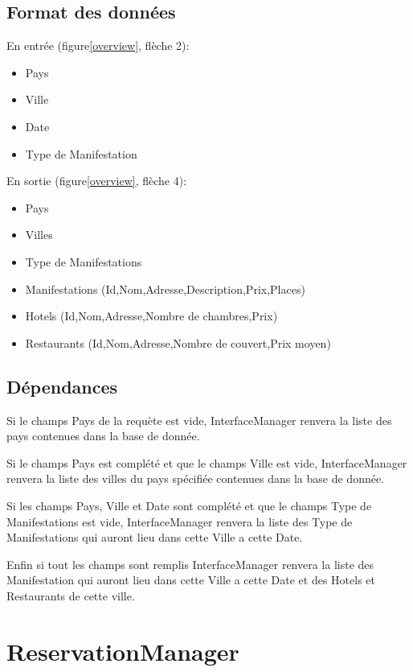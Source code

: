 		\subsection{Format des données}
		
			En entrée (figure\ref{overview}, flèche 2):
			\begin{itemize}
			  \item Pays
			  \item Ville
			  \item Date
			  \item Type de Manifestation\\
			\end{itemize}
			
			En sortie (figure\ref{overview}, flèche 4):
			\begin{itemize}
			  \item Pays
			  \item Villes
			  \item Type de Manifestations
			  \item Manifestations (Id,Nom,Adresse,Description,Prix,Places)
			  \item Hotels (Id,Nom,Adresse,Nombre de chambres,Prix)
			  \item Restaurants (Id,Nom,Adresse,Nombre de couvert,Prix moyen)
			\end{itemize}
		
		\subsection{Dépendances}
		
			Si le champs Pays de la requète est vide, InterfaceManager
			renvera la liste des pays contenues dans la base de donnée.
			
			Si le champs Pays est complété et que le champs Ville est vide,
			InterfaceManager renvera la liste des villes du pays spécifiée contenues dans
			la base de donnée.
		
			Si les champs Pays, Ville et Date sont complété et que le champs Type de
			Manifestations est vide, InterfaceManager renvera la liste des Type de
			Manifestations qui auront lieu dans cette Ville a cette Date.
			
			Enfin si tout les champs sont remplis InterfaceManager renvera la liste des
			Manifestation qui auront lieu dans cette Ville a cette Date et des Hotels et
			Restaurants de cette ville.
		
	\section{ReservationManager}	
	
